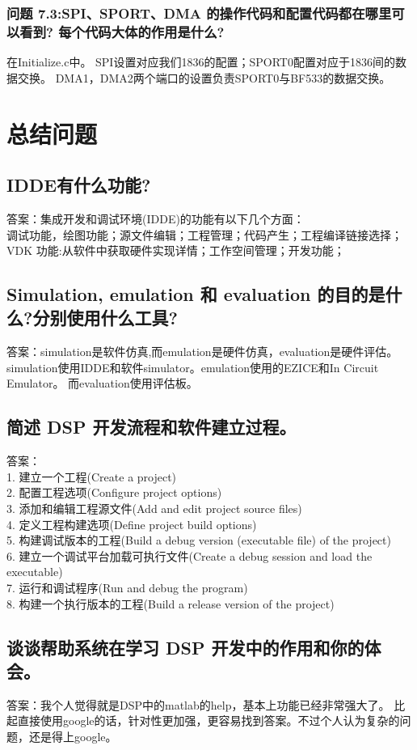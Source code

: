 \documentclass{article}
\begin{document}
\begin{CJK}{UTF8}{gbsn}
\subsubsection*{问题 7.3:SPI、SPORT、DMA 的操作代码和配置代码都在哪里可以看到?
每个代码大体的作用是什么?}
在Initialize.c中。
SPI设置对应我们1836的配置；SPORT0配置对应于1836间的数据交换。
DMA1，DMA2两个端口的设置负责SPORT0与BF533的数据交换。
\section{总结问题}
\subsection{IDDE有什么功能?}
答案：集成开发和调试环境(IDDE)的功能有以下几个方面：\\
调试功能，绘图功能；源文件编辑；工程管理；代码产生；工程编译链接选择；VDK 功能:从软件中获取硬件实现详情；工作空间管理；开发功能；
\subsection{Simulation, emulation 和 evaluation 的目的是什么?分别使用什么工具?}
答案：simulation是软件仿真,而emulation是硬件仿真，evaluation是硬件评估。\\
simulation使用IDDE和软件simulator。emulation使用的EZICE和In Circuit Emulator。
而evaluation使用评估板。
\subsection{简述 DSP 开发流程和软件建立过程。}
答案：\\
1. 建立一个工程(Create a project)\\
2. 配置工程选项(Configure project options)\\
3. 添加和编辑工程源文件(Add and edit project source files)\\
4. 定义工程构建选项(Define project build options)\\
5. 构建调试版本的工程(Build a debug version (executable file) of the project)\\
6. 建立一个调试平台加载可执行文件(Create a debug session and load the executable)\\
7. 运行和调试程序(Run and debug the program)\\
8. 构建一个执行版本的工程(Build a release version of the project)\\
\subsection{谈谈帮助系统在学习 DSP 开发中的作用和你的体会。}
答案：我个人觉得就是DSP中的matlab的help，基本上功能已经非常强大了。
比起直接使用google的话，针对性更加强，更容易找到答案。不过个人认为复杂的问题，还是得上google。

\end{CJK}
\end{document}
